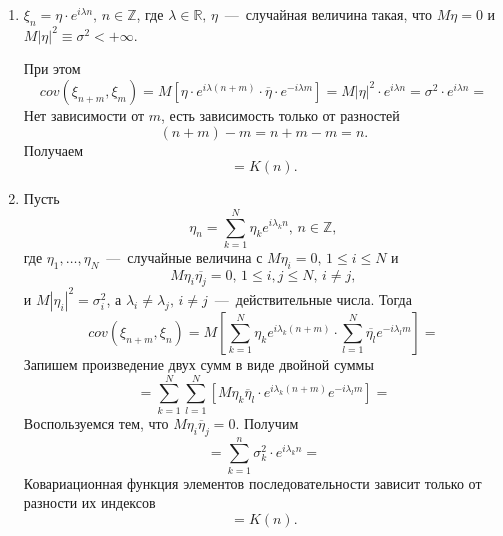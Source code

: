 \begin{enumerate}
  \item $ \xi_n = \eta \cdot e^{i \lambda n}, \, n \in \mathbb{Z}$,
  где $ \lambda \in \mathbb{R}, \, \eta $~---~случайная величина такая,
  что $M \eta = 0$ и $M \left| \eta \right|^2 \equiv \sigma^2 < +\infty $.

  При этом
  \begin{equation*}
    cov \left( \xi_{n + m}, \xi_m \right) =
    M \left[
      \eta \cdot e^{i \lambda \left( n + m \right) } \cdot \overline{ \eta } \cdot e^{-i \lambda m}
    \right] =
    M \left| \eta \right|^2 \cdot e^{i \lambda n} =
    \sigma^2 \cdot e^{i \lambda n} =
  \end{equation*}
  Нет зависимости от $m$,
  есть зависимость только от разностей
  \begin{equation*}
    \left( n + m \right) - m = n + m - m = n.
  \end{equation*}
  Получаем
  \begin{equation*}
    = K \left( n \right).
  \end{equation*}
  \item Пусть
  \begin{equation*}
    \eta_n =
    \sum \limits_{k = 1}^N \eta_k e^{i \lambda_k n}, \,
    n \in \mathbb{Z},
  \end{equation*}
  где $ \eta_1, \dotsc, \eta_N$~---~случайные величина с $M \eta_i = 0, \, 1 \leq i \leq N$ и
  \begin{equation*}
    M \eta_i \overline{ \eta_j} = 0, \,
    1 \leq i, j \leq N, \,
    i \neq j,
  \end{equation*}
  и $M \left| \eta_i \right|^2 = \sigma_i^2$,
  а $ \lambda_i \neq \lambda_j, \, i \neq j$~---~действительные числа.
  Тогда
  \begin{equation*}
    cov \left( \xi_{n + m}, \xi_n \right) =
    M \left[
      \sum \limits_{k = 1}^N \eta_k e^{i \lambda_k \left( n + m \right) } \cdot
      \sum \limits_{l = 1}^N \overline{ \eta_l} e^{-i \lambda_l m}
    \right] =
  \end{equation*}
  Запишем произведение двух сумм в виде двойной суммы
  \begin{equation*}
    = \sum \limits_{k = 1}^N
      \sum \limits_{l = 1}^N \left[
        M \eta_k \overline{ \eta }_l \cdot e^{i \lambda_k \left( n + m \right) } e^{-i \lambda_l m}
      \right] =
  \end{equation*}
  Воспользуемся тем, что $M \eta_i \overline{ \eta }_j = 0$.
  Получим
  \begin{equation*}
    = \sum \limits_{k = 1}^n \sigma_k^2 \cdot e^{i \lambda_k n} =
  \end{equation*}
  Ковариационная функция элементов последовательности зависит только от разности их индексов
  \begin{equation*}
    = K \left( n \right).
  \end{equation*}
\end{enumerate}

